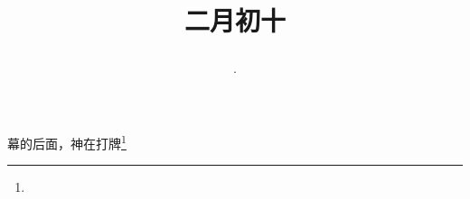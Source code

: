 \title{\date[d=19,m=3,y=2024][year:cn-y,年,month:cn,day:cn,日,·,weekday]·二月初十 }
幕的后面，神在打牌\footnote{ }

